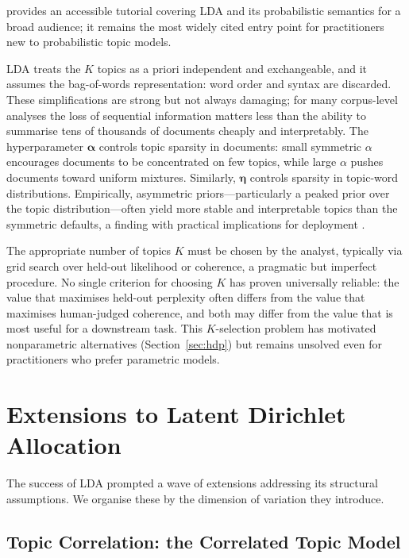 \documentclass[11pt,a4paper]{article}
\newcommand{\vect}[1]{\boldsymbol{#1}}
\begin{document}
\textcite{blei2012probabilistic} provides an accessible tutorial
covering LDA and its probabilistic semantics for a broad audience;
it remains the most widely cited entry point for practitioners new to
probabilistic topic models.

LDA treats the $K$ topics as a priori independent and exchangeable,
and it assumes the bag-of-words representation: word order and syntax
are discarded.
These simplifications are strong but not always damaging;
for many corpus-level analyses the loss of sequential information
matters less than the ability to summarise tens of thousands of
documents cheaply and interpretably.
The hyperparameter $\vect{\alpha}$ controls topic sparsity in
documents: small symmetric $\alpha$ encourages documents to be
concentrated on few topics, while large $\alpha$ pushes documents
toward uniform mixtures.
Similarly, $\vect{\eta}$ controls sparsity in topic-word distributions.
Empirically, asymmetric priors---particularly a peaked prior over
the topic distribution---often yield more stable and interpretable
topics than the symmetric defaults, a finding with practical
implications for deployment \parencite{koltcov2014lda}.

The appropriate number of topics $K$ must be chosen by the analyst,
typically via grid search over held-out likelihood or coherence, a
pragmatic but imperfect procedure.
No single criterion for choosing $K$ has proven universally reliable:
the value that maximises held-out perplexity often differs from the
value that maximises human-judged coherence, and both may differ from
the value that is most useful for a downstream task.
This $K$-selection problem has motivated nonparametric alternatives
(Section~\ref{sec:hdp}) but remains unsolved even for practitioners
who prefer parametric models.

\section{Extensions to Latent Dirichlet Allocation}
\label{sec:lda-extensions}

The success of LDA prompted a wave of extensions addressing its
structural assumptions.
We organise these by the dimension of variation they introduce.

\subsection{Topic Correlation: the Correlated Topic Model}
\label{sec:ctm}
\end{document}
